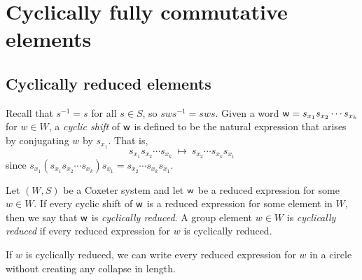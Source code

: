 \chapter{Cyclically fully commutative elements}

\section{Cyclically reduced elements}
    Recall that $s^{-1} = s$ for all $s \in S$, so $sws^{-1} = sws$.
    Given a word $\mathsf{w} = s_{x_1} s_{x_2} \cdots s_{x_k}$ for $w \in W$, a \emph{cyclic shift} of $\mathsf{w}$ is defined to be the natural expression that arises by conjugating $w$ by $s_{x_1}$.
    That is, $$s_{x_1} s_{x_2} \cdots s_{x_k} ~{\mapsto}~ s_{x_2} \cdots s_{x_k} s_{x_1}$$ since $s_{x_1}(s_{x_1} s_{x_2} \cdots s_{x_k})s_{x_1} = s_{x_2} \cdots s_{x_k} s_{x_1}$.

\begin{definition}\label{def:cycred}
    Let $(W,S)$ be a Coxeter system and let $\mathsf{w}$ be a reduced expression for some $w \in W$. If every cyclic shift of $\mathsf{w}$ is a reduced expression for some element in $W$, then we say that $\mathsf{w}$ is \emph{cyclically reduced}. A group element $w \in W$ is \emph{cyclically reduced} if every reduced expression for $w$ is cyclically reduced.
\end{definition}

    If $w$ is cyclically reduced, we can write every reduced expression for $w$ in a circle without creating any collapse in length.
    
